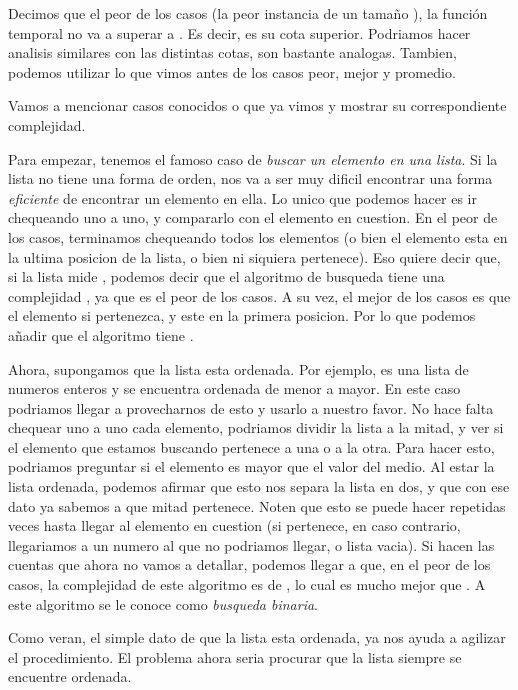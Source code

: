 \documentclass{article}
\begin{document}
Decimos que el peor de los casos (la peor instancia de un tamaño ), la función temporal  no va a superar a . Es decir, es su cota superior. Podriamos hacer analisis similares con las distintas cotas, son bastante analogas. Tambien, podemos utilizar lo que vimos antes de los casos peor, mejor y promedio.

Vamos a mencionar casos conocidos o que ya vimos y mostrar su correspondiente complejidad.

Para empezar, tenemos el famoso caso de \textit{buscar un elemento en una lista}. Si la lista no tiene una forma de orden, nos va a ser muy dificil encontrar una forma \textit{eficiente} de encontrar un elemento en ella. Lo unico que podemos hacer es ir chequeando uno a uno, y compararlo con el elemento en cuestion. En el peor de los casos, terminamos chequeando todos los elementos (o bien el elemento esta en la ultima posicion de la lista, o bien ni siquiera pertenece). Eso quiere decir que, si la lista mide , podemos decir que el algoritmo de busqueda tiene una complejidad , ya que es el peor de los casos. A su vez, el mejor de los casos es que el elemento si pertenezca, y este en la primera posicion. Por lo que podemos añadir que el algoritmo tiene .

Ahora, supongamos que la lista esta ordenada. Por ejemplo, es una lista de numeros enteros y se encuentra ordenada de menor a mayor. En este caso podriamos llegar a provecharnos de esto y usarlo a nuestro favor. No hace falta chequear uno a uno cada elemento, podriamos dividir la lista a la mitad, y ver si el elemento que estamos buscando pertenece a una o a la otra. Para hacer esto, podriamos preguntar si el elemento es mayor que el valor del medio. Al estar la lista ordenada, podemos afirmar que esto nos separa la lista en dos, y que con ese dato ya sabemos a que mitad pertenece. Noten que esto se puede hacer repetidas veces hasta llegar al elemento en cuestion (si pertenece, en caso contrario, llegariamos a un numero al que no podriamos llegar, o lista vacia). Si hacen las cuentas que ahora no vamos a detallar, podemos llegar a que, en el peor de los casos, la complejidad de este algoritmo es de , lo cual es mucho mejor que . A este algoritmo se le conoce como \textit{busqueda binaria}.

Como veran, el simple dato de que la lista esta ordenada, ya nos ayuda a agilizar el procedimiento. El problema ahora seria procurar que la lista siempre se encuentre ordenada.
\end{document}
